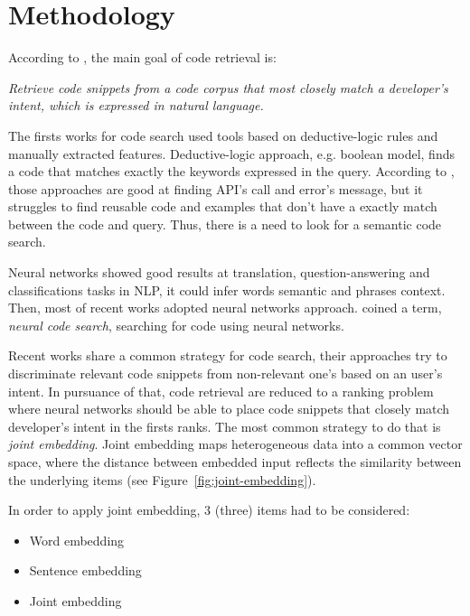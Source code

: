 \documentclass[sigconf]{acmart}
\begin{document}
\section{Methodology}
\label{sec:methodology}

According to \cite{cambronero-deep-code-search-2019}, the main goal of code retrieval is:

\emph{Retrieve code snippets from a code corpus that most closely match a developer's intent, which is expressed in natural language.}

The firsts works for code search used tools based on deductive-logic rules and manually extracted features. Deductive-logic approach, e.g. boolean model, finds a code that matches exactly the keywords expressed in the query. According to \cite{yan-benchmark-code-search-information-retrieval-deep-learning:2020}, those approaches are good at finding API's call and error's message, but it struggles to find reusable code and examples that don't have a exactly match between the code and query. Thus, there is a need to look for a semantic code search.

Neural networks showed good results at translation, question-answering and classifications tasks in NLP, it could infer words semantic and phrases context. Then, most of recent works adopted neural networks approach. \cite{cambronero-deep-code-search-2019} coined a term, \emph{neural code search}, searching for code using neural networks.

Recent works share a common strategy for code search, their approaches try to discriminate relevant code snippets from non-relevant one's based on an user's intent. In pursuance of that, code retrieval are reduced to a ranking problem where neural networks should be able to place code snippets that closely match developer's intent in the firsts ranks. The most common strategy to do that is \emph{joint embedding}. Joint embedding maps heterogeneous data into a common vector space, where the distance between embedded input reflects the similarity between the underlying items \cite{li-joint-embedding-images-2015} (see Figure~\ref{fig:joint-embedding}).

In order to apply joint embedding, 3 (three) items had to be considered:

\begin{itemize}
    \item Word embedding
    \item Sentence embedding
    \item Joint embedding
\end{itemize}
\end{document}
